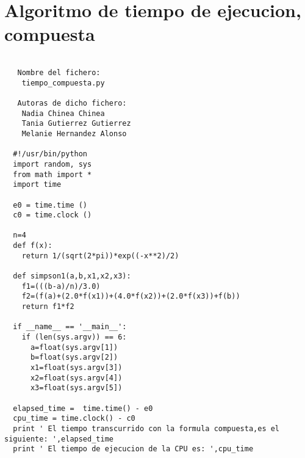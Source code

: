 \section{Algoritmo de tiempo de ejecucion, compuesta}
\label{sec4}
\begin{center}
\begin{footnotesize}
\begin{verbatim}
   
   Nombre del fichero:
    tiempo_compuesta.py

   Autoras de dicho fichero:
    Nadia Chinea Chinea 
    Tania Gutierrez Gutierrez 
    Melanie Hernandez Alonso

  #!/usr/bin/python
  import random, sys
  from math import *
  import time
  
  e0 = time.time ()
  c0 = time.clock ()
 
  n=4
  def f(x):
    return 1/(sqrt(2*pi))*exp((-x**2)/2)
  
  def simpson1(a,b,x1,x2,x3):
    f1=(((b-a)/n)/3.0)
    f2=(f(a)+(2.0*f(x1))+(4.0*f(x2))+(2.0*f(x3))+f(b))
    return f1*f2 
      
  if __name__ == '__main__':
    if (len(sys.argv)) == 6:
      a=float(sys.argv[1])
      b=float(sys.argv[2])
      x1=float(sys.argv[3])
      x2=float(sys.argv[4])
      x3=float(sys.argv[5])
 
  elapsed_time =  time.time() - e0
  cpu_time = time.clock() - c0
  print ' El tiempo transcurrido con la formula compuesta,es el siguiente: ',elapsed_time
  print ' El tiempo de ejecucion de la CPU es: ',cpu_time
\end{verbatim}
\end{footnotesize}
\end{center}

